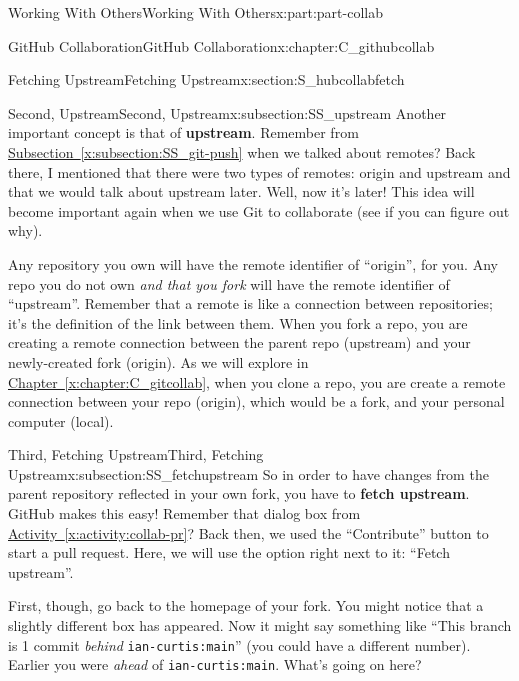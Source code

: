 \documentclass[oneside,10pt,]{book}
\newcommand{\xreffont}{\relax}
\newcommand{\mono}[1]{\texttt{#1}}
\newcommand{\terminology}[1]{\textbf{#1}}
\begin{document}
\begin{partptx}{Working With Others}{}{Working With Others}{}{}{x:part:part-collab}
\begin{chapterptx}{GitHub Collaboration}{}{GitHub Collaboration}{}{}{x:chapter:C_githubcollab}
\begin{sectionptx}{Fetching Upstream}{}{Fetching Upstream}{}{}{x:section:S_hubcollabfetch}
\typeout{************************************************}
%
\begin{subsectionptx}{Second, Upstream}{}{Second, Upstream}{}{}{x:subsection:SS_upstream}
%
%
Another important concept is that of \terminology{upstream}. Remember from \hyperref[x:subsection:SS_git-push]{Subsection~{\xreffont\ref{x:subsection:SS_git-push}}} when we talked about remotes? Back there, I mentioned that there were two types of remotes: origin and upstream and that we would talk about upstream later. Well, now it's later! This idea will become important again when we use Git to collaborate (see if you can figure out why).%
\par
Any repository you own will have the remote identifier of ``origin'', for you. Any repo you do not own \emph{and that you fork} will have the remote identifier of ``upstream''. Remember that a remote is like a connection between repositories; it's the definition of the link between them. When you fork a repo, you are creating a remote connection between the parent repo (upstream) and your newly-created fork (origin). As we will explore in \hyperref[x:chapter:C_gitcollab]{Chapter~{\xreffont\ref{x:chapter:C_gitcollab}}}, when you clone a repo, you are create a remote connection between your repo (origin), which would be a fork, and your personal computer (local).%
\end{subsectionptx}
%
%
\typeout{************************************************}
\typeout{************************************************}
%
\begin{subsectionptx}{Third, Fetching Upstream}{}{Third, Fetching Upstream}{}{}{x:subsection:SS_fetchupstream}
%
%
So in order to have changes from the parent repository reflected in your own fork, you have to \terminology{fetch upstream}. GitHub makes this easy! Remember that dialog box from \hyperref[x:activity:collab-pr]{Activity~{\xreffont\ref{x:activity:collab-pr}}}? Back then, we used the ``Contribute'' button to start a pull request. Here, we will use the option right next to it: ``Fetch upstream''.%
\par
First, though, go back to the homepage of your fork. You might notice that a slightly different box has appeared. Now it might say something like ``This branch is 1 commit \emph{behind} \mono{ian-curtis:main}'' (you could have a different number). Earlier you were \emph{ahead} of \mono{ian-curtis:main}. What's going on here?%

\end{subsectionptx}
\end{sectionptx}
\end{chapterptx}
\end{partptx}
\end{document}
